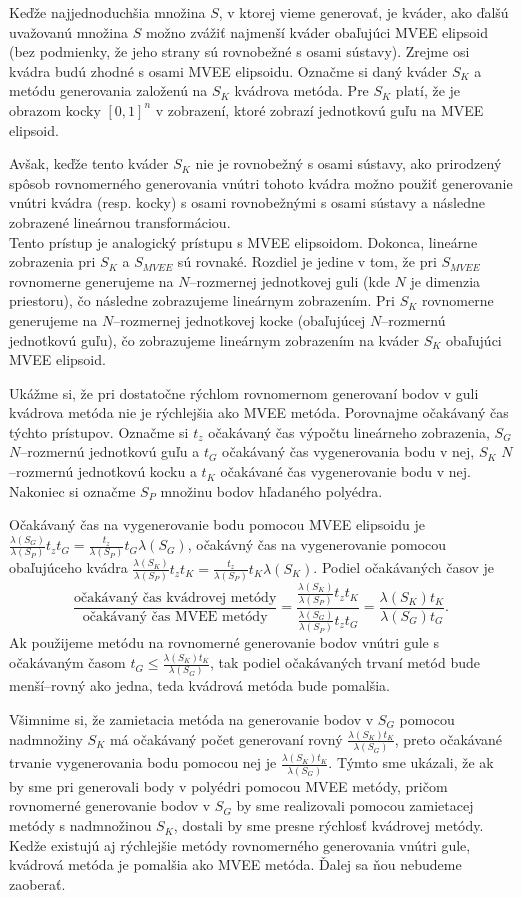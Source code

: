 Keďže najjednoduchšia množina $S$, v ktorej vieme generovať, je kváder, ako ďalšú uvažovanú množina $S$ možno zvážiť najmenší kváder obaľujúci MVEE elipsoid (bez podmienky, že jeho strany sú rovnobežné s osami sústavy). Zrejme osi kvádra budú zhodné s osami MVEE elipsoidu. Označme si daný kváder $S_K$ a metódu generovania založenú na $S_K$ kvádrova metóda. Pre $S_K$ platí, že je obrazom kocky $[0,1]^n$ v zobrazení, ktoré zobrazí jednotkovú guľu na MVEE elipsoid.

Avšak, keďže tento kváder $S_K$ nie je rovnobežný s osami sústavy, ako prirodzený spôsob rovnomerného generovania vnútri tohoto kvádra možno použiť generovanie vnútri kvádra (resp. kocky) s osami rovnobežnými s osami sústavy a následne zobrazené lineárnou transformáciou.\\

Tento prístup je analogický prístupu s MVEE elipsoidom. Dokonca, lineárne zobrazenia pri $S_K$ a $S_{MVEE}$ sú rovnaké. Rozdiel je jedine v tom, že pri $S_{MVEE}$ rovnomerne generujeme na $N$--rozmernej jednotkovej guli (kde $N$ je dimenzia priestoru), čo následne zobrazujeme lineárnym zobrazením. Pri $S_K$ rovnomerne generujeme na $N$--rozmernej jednotkovej kocke (obaľujúcej $N$--rozmernú jednotkovú guľu), čo zobrazujeme lineárnym zobrazením na kváder $S_K$ obaľujúci MVEE elipsoid.

Ukážme si, že pri dostatočne rýchlom rovnomernom generovaní bodov v guli kvádrova metóda nie je rýchlejšia ako MVEE metóda. Porovnajme očakávaný čas týchto prístupov. Označme si $t_z$ očakávaný čas výpočtu lineárneho zobrazenia, $S_G$ $N$--rozmernú jednotkovú guľu a $t_G$ očakávaný čas vygenerovania bodu v nej, $S_K$ $N$--rozmernú jednotkovú kocku a $t_K$ očakávané čas vygenerovanie bodu v nej. Nakoniec si označme $S_P$ množinu bodov hľadaného polyédra.

Očakávaný čas na vygenerovanie bodu pomocou MVEE elipsoidu je $\frac{\lambda(S_G)}{\lambda(S_P)}t_zt_G=\frac{t_z}{\lambda(S_P)}t_G\lambda(S_G)$, očakávný čas na vygenerovanie pomocou obaľujúceho kvádra $\frac{\lambda(S_K)}{\lambda(S_P)}t_zt_K=\frac{t_z}{\lambda(S_P)}t_K\lambda(S_K)$.
Podiel očakávaných časov je $$\frac{\text{očakávaný čas kvádrovej metódy}}{\text{očakávaný čas MVEE metódy}}=\frac{\frac{\lambda(S_K)}{\lambda(S_P)}t_zt_K}{\frac{\lambda(S_G)}{\lambda(S_P)}t_zt_G}=\frac{\lambda(S_K)t_K}{\lambda(S_G)t_G}.$$ Ak použijeme metódu na rovnomerné generovanie bodov vnútri gule s očakávaným časom $t_G \le \frac{\lambda(S_K)t_K}{\lambda(S_G)}$, tak podiel očakávaných trvaní metód bude menší--rovný ako jedna, teda kvádrová metóda bude pomalšia.

Všimnime si, že zamietacia metóda na generovanie bodov v $S_G$ pomocou nadmnožiny $S_K$ má očakávaný počet generovaní rovný $\frac{\lambda(S_K)t_K}{\lambda(S_G)}$, preto očakávané trvanie vygenerovania bodu pomocou nej je $\frac{\lambda(S_K)t_K}{\lambda(S_G)}$.
Týmto sme ukázali, že ak by sme pri generovali body v polyédri pomocou MVEE metódy, pričom rovnomerné generovanie bodov v $S_G$ by sme realizovali pomocou zamietacej metódy s nadmnožinou $S_K$, dostali by sme presne rýchlosť kvádrovej metódy. Kedže existujú aj rýchlejšie metódy rovnomerného generovania vnútri gule, kvádrová metóda je pomalšia ako MVEE metóda. Ďalej sa ňou nebudeme zaoberať.\\
